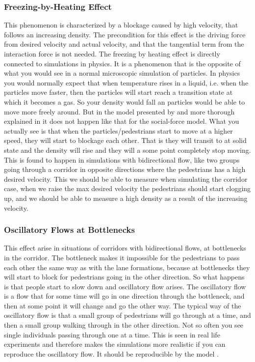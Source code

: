 \subsubsection{Freezing-by-Heating Effect}
This phenomenon is characterized by a blockage caused by high velocity,
that follows an increasing density. The precondition for this effect is the driving force from desired
velocity and actual velocity, and that the tangential term from the interaction
force is not needed. The freezing by heating effect is directly connected to simulations in
physics\cite{frebyheat}. It is a  phenomenon that is the opposite of what you would see in a
normal microscopic simulation of particles. In physics you would normally expect that when
temperature rises in a liquid, i.e. when the particles move faster, then the particles will
start reach a transition state at which it becomes a gas. So your density would fall an
particles would be able to move more freely around.
But in the model presented by \cite{self-org} and more thorough explained in \cite{frebyheat}
it does not happen like that for the social-force model. What you actually see is that when the
particles/pedestrians start to move at a higher speed, they will start to blockage each other.
That is they will transit to at solid state and the density will rise and they will a some point
completely stop moving. This is found to happen in simulations with bidirectional flow, like
two groups going through a corridor in opposite directions where the pedestrians has a high desired velocity.
This we should be able to measure when simulating the corridor case, when we raise the max desired
velocity the pedestrians should start clogging up, and we should be able to measure a high density as
a result of the increasing velocity.


\subsubsection{Oscillatory Flows at Bottlenecks}
This effect arise in situations of corridors with bidirectional flows, at bottlenecks in the corridor.
The bottleneck makes it impossible for the pedestrians
to pass each other the same way as with the lane formations, because at bottlenecks they will
start to block for pedestrians going in the other direction.
So what happens is that people start to slow down and oscillatory
flow arises. The oscillatory flow is a flow that for some time will go in one direction through
the bottleneck, and then at some point it will change and go the other way. The typical way of
the oscillatory flow is that a small group of pedestrians will go through at a time, and then
a small group walking through in the other direction.
Not so often you see single individuals passing through one at a time.
This is seen in real life experiments and therefore makes the simulations more realistic
if you can reproduce the oscillatory flow.
It should be reproducible by the model \cite{self-org}.

